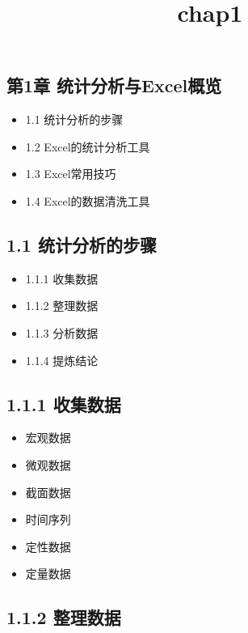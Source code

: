 \documentclass[
  letterpaper,
  DIV=11,
  numbers=noendperiod]{scrartcl}
\title{chap1}
\author{}
\date{}
\providecommand{\tightlist}{%
  \setlength{\itemsep}{0pt}\setlength{\parskip}{0pt}}\usepackage{longtable,booktabs,array}
\begin{document}
\maketitle

\subsection{第1章
统计分析与Excel概览}\label{ux7b2c1ux7ae0-ux7edfux8ba1ux5206ux6790ux4e0eexcelux6982ux89c8}

\begin{itemize}
\item
  1.1 统计分析的步骤
\item
  1.2 Excel的统计分析工具
\item
  1.3 Excel常用技巧
\item
  1.4 Excel的数据清洗工具
\end{itemize}

\subsection{1.1
统计分析的步骤}\label{ux7edfux8ba1ux5206ux6790ux7684ux6b65ux9aa4}

\begin{itemize}
\tightlist
\item
  1.1.1 收集数据
\item
  1.1.2 整理数据
\item
  1.1.3 分析数据
\item
  1.1.4 提炼结论
\end{itemize}

\subsection{1.1.1 收集数据}\label{ux6536ux96c6ux6570ux636e}

\begin{itemize}
\tightlist
\item
  宏观数据
\item
  微观数据
\item
  截面数据
\item
  时间序列
\item
  定性数据
\item
  定量数据
\end{itemize}

\subsection{1.1.2 整理数据}\label{ux6574ux7406ux6570ux636e}
\end{document}

